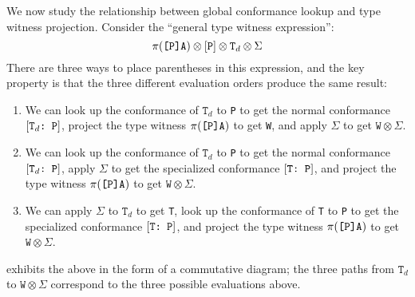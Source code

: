 \documentclass[../generics]{subfiles}
\begin{document}
We now study the relationship between global conformance lookup and type witness projection. Consider the ``general type witness expression'':
\[\pi(\texttt{[P]A})\otimes[\texttt{P}]\otimes\texttt{T}_d\otimes\Sigma\]
There are three ways to place parentheses in this expression, and the key property is that the three different evaluation orders produce the same result:
\begin{enumerate}
\item We can look up the conformance of $\texttt{T}_d$ to \texttt{P} to get the normal conformance $[\texttt{$\texttt{T}_d$:~P}]$, project the type witness $\pi(\texttt{[P]A})$ to get \texttt{W}, and apply $\Sigma$ to get $\texttt{W}\otimes\Sigma$.
\item We can look up the conformance of $\texttt{T}_d$ to \texttt{P} to get the normal conformance $[\texttt{$\texttt{T}_d$:~P}]$, apply $\Sigma$ to get the specialized conformance $[\texttt{T:~P}]$, and project the type witness $\pi(\texttt{[P]A})$ to get $\texttt{W}\otimes\Sigma$.
\item We can apply $\Sigma$ to $\texttt{T}_d$ to get \texttt{T}, look up the conformance of \texttt{T} to \texttt{P} to get the specialized conformance $[\texttt{T:~P}]$, and project the type witness $\pi(\texttt{[P]A})$ to get $\texttt{W}\otimes\Sigma$.
\end{enumerate}
 exhibits the above in the form of a commutative diagram; the three paths from $\texttt{T}_d$ to $\texttt{W}\otimes\Sigma$ correspond to the three possible evaluations above.

\begin{figure}\label{type witness diagram}
\begin{center}
\end{center}
\end{figure}
\end{document}
